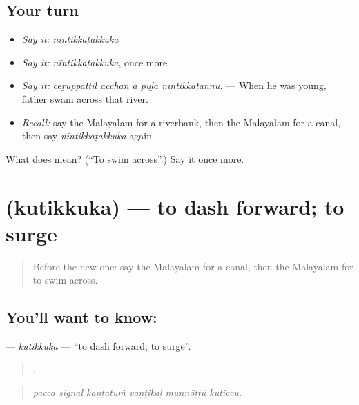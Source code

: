 \subsection*{Your turn}
\begin{itemize}
\raggedright
  \item \emph{Say it:} \emph{nīntikkaṭakkuka}
  \item \emph{Say it:} \emph{nīntikkaṭakkuka}, once more
  \item \emph{Say it:} \emph{ceṟuppattil acchan ā puḻa nīntikkaṭannu.} — When he was young, father swam across that river.
  \item \emph{Recall:} say the Malayalam for a riverbank, then the Malayalam for a canal, then say \emph{nīntikkaṭakkuka} again
\end{itemize}

\begin{tcolorbox}[breakable,colback=teal!4,colframe=teal!35!black,title={Before you move on}]
What does  mean? (\textquotedblleft{}To swim across\textquotedblright{}.) Say it once more.
\end{tcolorbox}
\section[\texorpdfstring{\ml{കുതിക്കുക} (kutikkuka)}{കുതിക്കുക (kutikkuka)}]{ (kutikkuka) — to dash forward; to surge}

\label{lesson:ML-C477-kutikkuka}



\begin{quote}
Before the new one: say the Malayalam for a canal, then the Malayalam for to swim across.
\end{quote}

\subsection*{You'll want to know: }
\textbf{} — \emph{kutikkuka} — \textquotedblleft{}to dash forward; to surge\textquotedblright{}.

\begin{quote}
     .
\end{quote}

\begin{quote}
\emph{pacca signal kaṇṭatuṁ vaṇṭikaḷ munnōṭṭŭ kuticcu.}
\end{quote}

